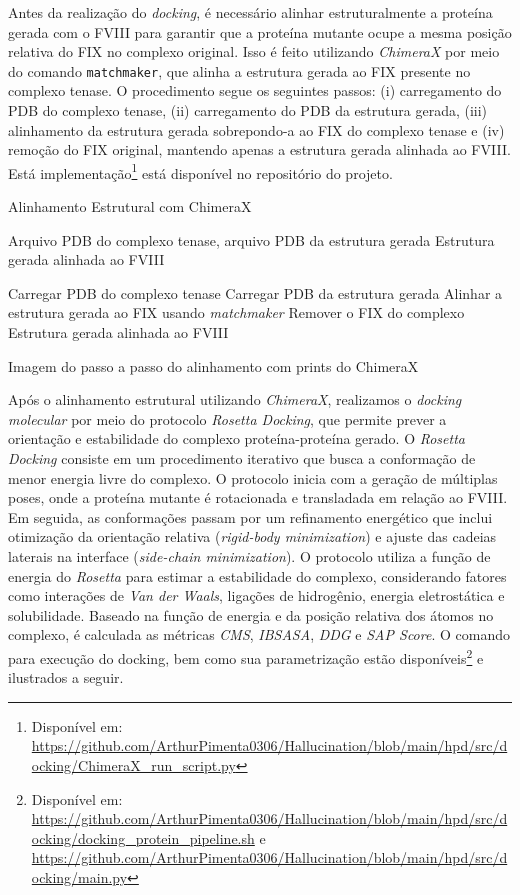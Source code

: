 Antes da realização do \textit{docking}, é necessário alinhar estruturalmente a proteína gerada com o FVIII
para garantir que a proteína mutante ocupe a mesma posição relativa do FIX no complexo original. 
Isso é feito utilizando \textit{ChimeraX} \cite{ChimeraX} por meio do comando \texttt{matchmaker}, 
que alinha a estrutura gerada ao FIX presente no complexo tenase. 
O procedimento segue os seguintes passos: (i) carregamento do PDB do complexo tenase, 
(ii) carregamento do PDB da estrutura gerada, (iii) alinhamento da estrutura gerada sobrepondo-a ao FIX do complexo tenase 
e (iv) remoção do FIX original, mantendo apenas a estrutura gerada alinhada ao FVIII.
Está implementação\footnote{Disponível em: \url{https://github.com/ArthurPimenta0306/Hallucination/blob/main/hpd/src/docking/ChimeraX_run_script.py}} está disponível
no repositório do projeto.

\begin{algorithm}
  \caption{Alinhamento Estrutural com ChimeraX}
  \label{alg:alignment_chimerax}
  \begin{algorithmic}[1]
  \Require Arquivo PDB do complexo tenase, arquivo PDB da estrutura gerada
  \Ensure Estrutura gerada alinhada ao FVIII

  \State Carregar PDB do complexo tenase
  \State Carregar PDB da estrutura gerada
  \State Alinhar a estrutura gerada ao FIX usando \textit{matchmaker}
  \State Remover o FIX do complexo
  \State \Return Estrutura gerada alinhada ao FVIII
  \end{algorithmic}
\end{algorithm}
{\color{red} Imagem do passo a passo do alinhamento com prints do ChimeraX}

Após o alinhamento estrutural utilizando \textit{ChimeraX}, realizamos o \textit{docking molecular} 
por meio do protocolo \textit{Rosetta Docking}, que permite prever a orientação e estabilidade do complexo proteína-proteína gerado.
O \textit{Rosetta Docking} consiste em um procedimento iterativo que busca a conformação de menor energia livre do complexo.
O protocolo inicia com a geração de múltiplas poses, onde a proteína mutante é rotacionada e transladada em relação ao FVIII.
Em seguida, as conformações passam por um refinamento energético que inclui otimização da 
orientação relativa (\textit{rigid-body minimization}) e ajuste das cadeias laterais na interface 
(\textit{side-chain minimization}). 
O protocolo utiliza a função de energia do \textit{Rosetta} para estimar a estabilidade do complexo,
considerando fatores como interações de \textit{Van der Waals}, ligações de hidrogênio, energia eletrostática e solubilidade.
Baseado na função de energia e da posição relativa dos átomos no complexo, é calculada as métricas \textit{CMS}, \textit{IBSASA}, 
\textit{DDG} e \textit{SAP Score}.
O comando para execução do docking, bem como sua parametrização estão disponíveis\footnote{Disponível em: \url{https://github.com/ArthurPimenta0306/Hallucination/blob/main/hpd/src/docking/docking_protein_pipeline.sh} e \url{https://github.com/ArthurPimenta0306/Hallucination/blob/main/hpd/src/docking/main.py}}
e ilustrados a seguir.

